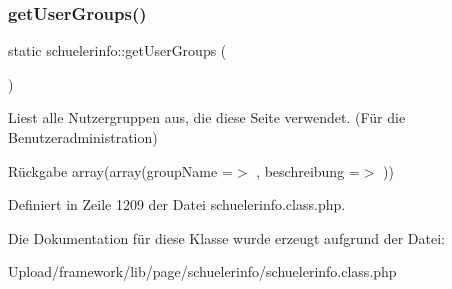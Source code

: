 \subsubsection{\texorpdfstring{get\+User\+Groups()}{getUserGroups()}}
{\footnotesize\ttfamily static schuelerinfo\+::get\+User\+Groups (\begin{DoxyParamCaption}{ }\end{DoxyParamCaption})\hspace{0.3cm}{\ttfamily [static]}}

Liest alle Nutzergruppen aus, die diese Seite verwendet. (Für die Benutzeradministration) \begin{DoxyReturn}{Rückgabe}
array(array(\textquotesingle{}group\+Name\textquotesingle{} =$>$ \textquotesingle{}\textquotesingle{}, \textquotesingle{}beschreibung\textquotesingle{} =$>$ \textquotesingle{}\textquotesingle{})) 
\end{DoxyReturn}


Definiert in Zeile 1209 der Datei schuelerinfo.\+class.\+php.



Die Dokumentation für diese Klasse wurde erzeugt aufgrund der Datei\+:\begin{DoxyCompactItemize}
\item 
Upload/framework/lib/page/schuelerinfo/schuelerinfo.\+class.\+php\end{DoxyCompactItemize}
